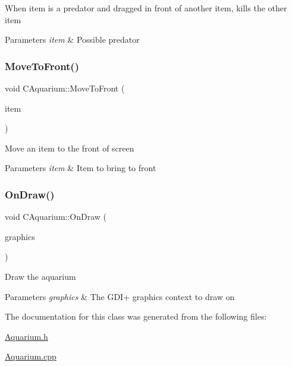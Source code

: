 When item is a predator and dragged in front of another item, kills the other item 
\begin{DoxyParams}{Parameters}
{\em item} & Possible predator \\
\hline
\end{DoxyParams}
\mbox{\label{class_c_aquarium_a44230dbff0c91121b55baae49e6fbb5e}} 
\subsubsection{\texorpdfstring{Move\+To\+Front()}{MoveToFront()}}
{\footnotesize\ttfamily void C\+Aquarium\+::\+Move\+To\+Front (\begin{DoxyParamCaption}\item[{std\+::shared\+\_\+ptr$<$ \hyperlink{class_c_item}{C\+Item} $>$}]{item }\end{DoxyParamCaption})}

Move an item to the front of screen 
\begin{DoxyParams}{Parameters}
{\em item} & Item to bring to front \\
\hline
\end{DoxyParams}
\mbox{\label{class_c_aquarium_a20b4899158d1ba4bc41217630d47e180}} 
\subsubsection{\texorpdfstring{On\+Draw()}{OnDraw()}}
{\footnotesize\ttfamily void C\+Aquarium\+::\+On\+Draw (\begin{DoxyParamCaption}\item[{Gdiplus\+::\+Graphics $\ast$}]{graphics }\end{DoxyParamCaption})}

Draw the aquarium 
\begin{DoxyParams}{Parameters}
{\em graphics} & The G\+D\+I+ graphics context to draw on \\
\hline
\end{DoxyParams}


The documentation for this class was generated from the following files\+:\begin{DoxyCompactItemize}
\item 
\hyperlink{_aquarium_8h}{Aquarium.\+h}\item 
\hyperlink{_aquarium_8cpp}{Aquarium.\+cpp}\end{DoxyCompactItemize}
